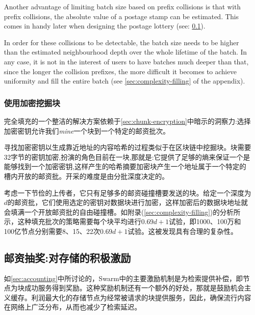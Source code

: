 Another advantage of limiting batch size based on prefix collisions is that with prefix collisions, the absolute value of a postage stamp can be estimated. This comes in handy later when designing the postage lottery (see: \ref{sec:postage-lottery}). 


In order for these collisions to be detectable, the batch size needs to be higher than the estimated neighbourhood depth over the whole lifetime of the batch. In any case, it is not in the interest of users to have batches much deeper than that, since the longer the collision prefixes, the more difficult it becomes to achieve uniformity and fill the entire batch  (see \ref{sec:complexity-filling} of the appendix). 


\subsubsection{使用加密挖掘块}

完全填充的一个整洁的解决方案依赖于\ref{sec:chunk-encryption}中暗示的洞察力:选择加密密钥允许我们\emph{mine}一个块到一个特定的邮资批次。

寻找加密密钥以生成靠近地址的内容哈希的过程类似于在区块链中挖掘块。块需要32字节的密钥加密,扮演的角色目前在一块,那就是:它提供了足够的熵来保证一个是能够找到一个加密密钥,这样产生的哈希摘要加密块产生一个地址属于一个特定的槽内开放的邮资批。开采的难度是由分批深度决定的。

考虑一下节俭的上传者，它只有足够多的邮资碰撞槽要发送的块。给定一个深度为$d$的邮资批，它们使用选定的密钥对数据块进行加密，这样加密后的数据块地址就会填满一个开放邮资批的自由碰撞槽。如附录(\ref{sec:complexity-filling})的分析所示，这种填充批次的策略需要每个块平均进行$0.69d+1$试验，即1000、100万和100亿节点分别需要8、15、22次$0.69d+1$试验。这被发现具有合理的复杂性。


\subsection{邮资抽奖:对存储的积极激励\statusyellow}\label{sec:postage-lottery}

\yellow{}

如\ref{sec:accounting}中所讨论的，Swarm中的主要激励机制是为检索提供补偿，即节点为块成功服务得到奖励。这种奖励机制还有一个额外的好处，那就是鼓励机会主义缓存。利润最大化的存储节点为经常被请求的块提供服务，因此，确保流行内容在网络上广泛分布，从而也减少了检索延迟。

